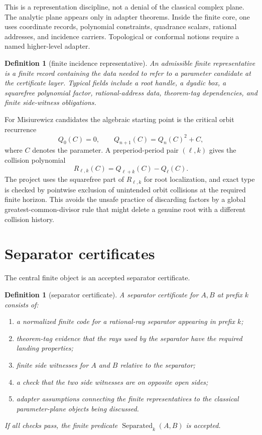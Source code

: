 \documentclass[11pt]{amsart}
\newtheorem{definition}[theorem]{Definition}
\begin{document}
This is a representation discipline, not a denial of the classical complex plane.  The analytic plane appears only in adapter theorems.  Inside the finite core, one uses coordinate records, polynomial constraints, quadrance scalars, rational addresses, and incidence carriers.  Topological or conformal notions require a named higher-level adapter.

\begin{definition}[finite incidence representative]
An admissible finite representative is a finite record containing the data needed to refer to a parameter candidate at the certificate layer.  Typical fields include a root handle, a dyadic box, a squarefree polynomial factor, rational-address data, theorem-tag dependencies, and finite side-witness obligations.
\end{definition}

For Misiurewicz candidates the algebraic starting point is the critical orbit recurrence
\[
        Q_0(C)=0,\qquad Q_{n+1}(C)=Q_n(C)^2+C,
\]
where \(C\) denotes the parameter.  A preperiod-period pair \((\ell,k)\) gives the collision polynomial
\[
        R_{\ell,k}(C)=Q_{\ell+k}(C)-Q_\ell(C).
\]
The project uses the squarefree part of \(R_{\ell,k}\) for root localization, and exact type is checked by pointwise exclusion of unintended orbit collisions at the required finite horizon.  This avoids the unsafe practice of discarding factors by a global greatest-common-divisor rule that might delete a genuine root with a different collision history.

\section{Separator certificates}

The central finite object is an accepted separator certificate.

\begin{definition}[separator certificate]
A separator certificate for \(A,B\) at prefix \(k\) consists of:
\begin{enumerate}[label=(\roman*)]
\item a normalized finite code for a rational-ray separator appearing in prefix \(k\);
\item theorem-tag evidence that the rays used by the separator have the required landing properties;
\item finite side witnesses for \(A\) and \(B\) relative to the separator;
\item a check that the two side witnesses are on opposite open sides;
\item adapter assumptions connecting the finite representatives to the classical parameter-plane objects being discussed.
\end{enumerate}
If all checks pass, the finite predicate \(\operatorname{Separated}_k(A,B)\) is accepted.
\end{definition}
\end{document}
